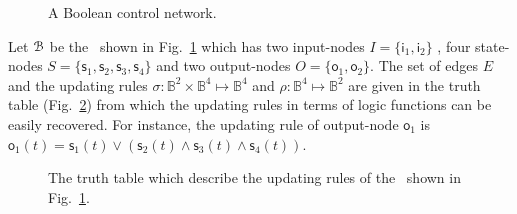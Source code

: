 \begin{example}
\begin{figure}[thpb]
		\caption{A Boolean control network. }%
		\label{fig:1}
	\end{figure}
%	
Let ${\mathcal{B}}$ be the \BCN\  shown in Fig.~\ref{fig:1} which has two  input-nodes $I=\{\mathsf{i}_1,\mathsf{i}_2\}$ , four state-nodes $S=\{\mathsf{s}_1, \mathsf{s}_2,\mathsf{s}_3, \mathsf{s}_4\}$ and two output-nodes $O=\{\mathsf{o}_1,\mathsf{o}_2\}$. The set of edges $E$ and 
the updating rules $\sigma: \mathbb{B}^{2}\times \mathbb{B}^{4}\mapsto \mathbb{B}^4$ and $\rho:\mathbb{B}^4\mapsto \mathbb{B}^2$ are given in the truth table (Fig.~\ref{fig:2}) from which the updating rules in terms of logic functions can be easily recovered.   For instance, %
the updating rule of output-node $\mathsf{o}_1$ is 
$\mathsf{o}_1(t)=\mathsf{s}_1(t)\vee {({\mathsf{s}_2}(t)\wedge { \mathsf{s}_3}(t)\wedge {\mathsf{s}_4}(t))}$. 
 \begin{figure}[thpb]
	\centering
	\caption{The truth table which describe the updating rules of the \BCN\ shown in Fig.~\ref{fig:1}.}
	\label{fig:2}
\end{figure}
\end{example}   

